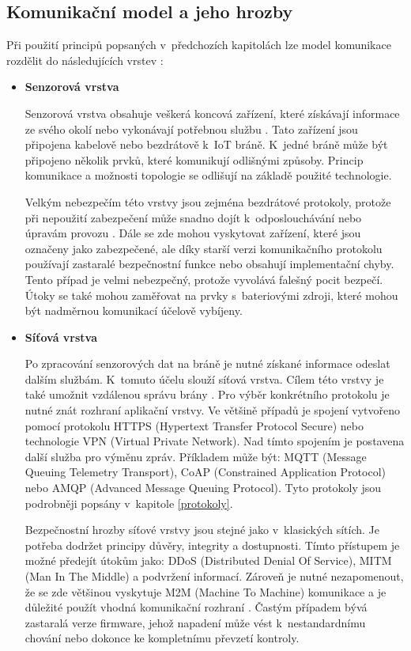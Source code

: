  \subsection{Komunikační model a jeho hrozby}
 Při použití principů popsaných v~předchozích kapitolách lze model komunikace rozdělit
 do následujících vrstev \cite{iotSurvey}:
 \begin{itemize}

 \item \textbf{Senzorová vrstva}
 
 Senzorová vrstva obsahuje veškerá koncová zařízení, které získávají informace ze svého
 okolí nebo vykonávají potřebnou službu \cite{secFramework}. Tato zařízení jsou připojena
 kabelově nebo bezdrátově k~IoT bráně. K~jedné bráně může být připojeno několik
 prvků, které komunikují odlišnými způsoby. Princip komunikace a možnosti topologie se odlišují
 na základě použité technologie.
 
 Velkým nebezpečím této vrstvy jsou zejména bezdrátové protokoly, protože při nepoužití
 zabezpečení může snadno dojít k~odposlouchávání nebo úpravám provozu \cite{iotSurvey}.
 Dále se zde mohou vyskytovat zařízení, které jsou označeny jako zabezpečené, 
 ale díky starší verzi komunikačního protokolu používají zastaralé bezpečnostní funkce
 nebo obsahují implementační chyby. 
 Tento případ je velmi nebezpečný, protože vyvolává falešný pocit bezpečí. Útoky se také mohou 
 zaměřovat na prvky s~bateriovými zdroji, které mohou být nadměrnou komunikací
 účelově vybíjeny.
 
 \item \textbf{Síťová vrstva}
 
  Po zpracování senzorových dat na bráně je nutné získané informace odeslat dalším
 službám. K~tomuto účelu slouží síťová vrstva. Cílem této vrstvy je také umožnit 
 vzdálenou správu brány \cite{secFramework}. Pro výběr konkrétního protokolu je 
 nutné znát rozhraní aplikační vrstvy. Ve většině případů je  spojení vytvořeno
 pomocí protokolu HTTPS (Hypertext Transfer Protocol Secure) nebo technologie
 VPN (Virtual Private Network). Nad tímto spojením je postavena další služba pro 
 výměnu zpráv. Příkladem může být: MQTT (Message Queuing Telemetry Transport),
 CoAP (Constrained Application Protocol) nebo
 AMQP (Advanced Message Queuing Protocol). Tyto protokoly jsou podrobněji popsány
v~kapitole \ref{protokoly}.
 
 Bezpečnostní hrozby síťové vrstvy jsou stejné jako v~klasických sítích. Je potřeba
 dodržet principy důvěry, integrity a dostupnosti. Tímto přístupem je možné
 předejít útokům jako: DDoS (Distributed Denial Of Service),
 MITM (Man In The Middle) a podvržení informací. Zároveň je nutné
 nezapomenout, že se zde většinou vyskytuje M2M (Machine To Machine)
 komunikace a je důležité použít 
 vhodná komunikační rozhraní \cite{iotSurvey}. Častým případem bývá zastaralá 
 verze firmware, jehož napadení může vést k~nestandardnímu chování nebo dokonce 
 ke kompletnímu převzetí kontroly. 
 

\end{itemize}
